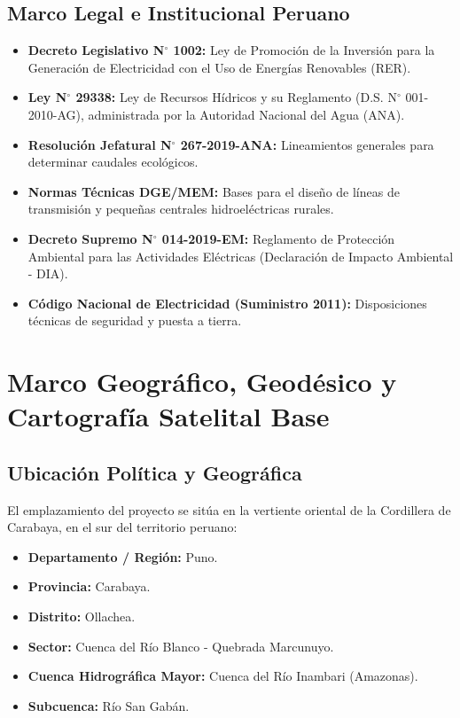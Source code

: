 \documentclass[11pt,a4paper]{report}
\begin{document}
\section{Marco Legal e Institucional Peruano}
\begin{itemize}
    \item \textbf{Decreto Legislativo N$^\circ$ 1002:} Ley de Promoción de la Inversión para la Generación de Electricidad con el Uso de Energías Renovables (RER).
    \item \textbf{Ley N$^\circ$ 29338:} Ley de Recursos Hídricos y su Reglamento (D.S. N$^\circ$ 001-2010-AG), administrada por la Autoridad Nacional del Agua (ANA).
    \item \textbf{Resolución Jefatural N$^\circ$ 267-2019-ANA:} Lineamientos generales para determinar caudales ecológicos.
    \item \textbf{Normas Técnicas DGE/MEM:} Bases para el diseño de líneas de transmisión y pequeñas centrales hidroeléctricas rurales.
    \item \textbf{Decreto Supremo N$^\circ$ 014-2019-EM:} Reglamento de Protección Ambiental para las Actividades Eléctricas (Declaración de Impacto Ambiental - DIA).
    \item \textbf{Código Nacional de Electricidad (Suministro 2011):} Disposiciones técnicas de seguridad y puesta a tierra.
\end{itemize}

\chapter{Marco Geográfico, Geodésico y Cartografía Satelital Base}
\section{Ubicación Política y Geográfica}
El emplazamiento del proyecto se sitúa en la vertiente oriental de la Cordillera de Carabaya, en el sur del territorio peruano:
\begin{itemize}
    \item \textbf{Departamento / Región:} Puno.
    \item \textbf{Provincia:} Carabaya.
    \item \textbf{Distrito:} Ollachea.
    \item \textbf{Sector:} Cuenca del Río Blanco - Quebrada Marcunuyo.
    \item \textbf{Cuenca Hidrográfica Mayor:} Cuenca del Río Inambari (Amazonas).
    \item \textbf{Subcuenca:} Río San Gabán.
\end{itemize}
\end{document}
